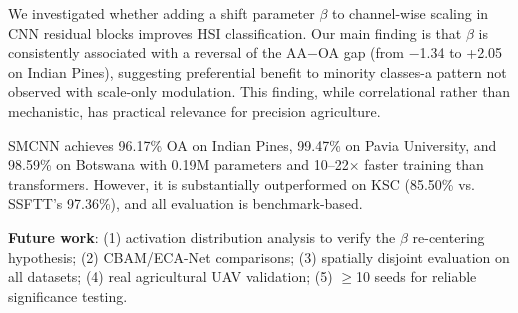 \documentclass[conference]{IEEEtran}
\begin{document}
We investigated whether adding a shift parameter $\beta$ to channel-wise scaling in CNN residual blocks improves HSI classification. Our main finding is that $\beta$ is consistently associated with a reversal of the AA$-$OA gap (from $-$1.34 to +2.05 on Indian Pines), suggesting preferential benefit to minority classes-a pattern not observed with scale-only modulation. This finding, while correlational rather than mechanistic, has practical relevance for precision agriculture.

SMCNN achieves 96.17\% OA on Indian Pines, 99.47\% on Pavia University, and 98.59\% on Botswana with 0.19M parameters and 10--22$\times$ faster training than transformers. However, it is substantially outperformed on KSC (85.50\% vs. SSFTT's 97.36\%), and all evaluation is benchmark-based.

\textbf{Future work}: (1) activation distribution analysis to verify the $\beta$ re-centering hypothesis; (2) CBAM/ECA-Net comparisons; (3) spatially disjoint evaluation on all datasets; (4) real agricultural UAV validation; (5) $\geq$10 seeds for reliable significance testing.
\end{document}

